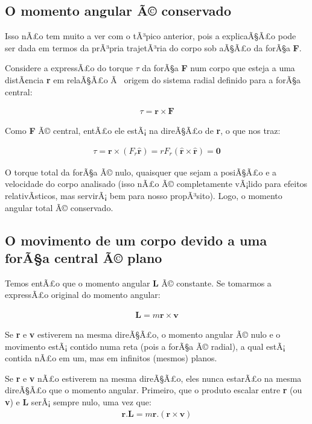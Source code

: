 \subsection{O momento angular Ã© conservado}

Isso nÃ£o tem muito a ver com o tÃ³pico anterior, pois a explicaÃ§Ã£o pode ser dada em termos da prÃ³pria trajetÃ³ria do corpo sob aÃ§Ã£o da forÃ§a \textbf{F}. {\\}

Considere a expressÃ£o do torque $\tau$ da forÃ§a \textbf{F} num corpo que esteja a uma distÃ¢ncia \textbf{r} em relaÃ§Ã£o Ã  origem do sistema radial definido para a forÃ§a central:

\begin{eqnarray}
	\tau = \mathbf{r} \times \mathbf{F} \label{eq19}
\end{eqnarray}

Como \textbf{F} Ã© central, entÃ£o ele estÃ¡ na direÃ§Ã£o de \textbf{r}, o que nos traz:

\begin{eqnarray}
	\tau = \mathbf{r} \times (F_r\mathbf{\hat{r}}) = rF_r(\mathbf{\hat{r}} \times \mathbf{\hat{r}}) = \mathbf{0} \label{eq20}
\end{eqnarray}

O torque total da forÃ§a Ã© nulo, quaisquer que sejam a posiÃ§Ã£o e a velocidade do corpo analisado (isso nÃ£o Ã© completamente vÃ¡lido para efeitos relativÃ­sticos, mas servirÃ¡ bem para nosso propÃ³sito). Logo, o momento angular total Ã© conservado.

\subsection{O movimento de um corpo devido a uma forÃ§a central Ã© plano}

Temos entÃ£o que o momento angular \textbf{L} Ã© constante. Se tomarmos a expressÃ£o original do momento angular:

\begin{eqnarray}
	\mathbf{L} = m\mathbf{r} \times \mathbf{v} \label{extra01}
\end{eqnarray}

Se \textbf{r} e \textbf{v} estiverem na mesma direÃ§Ã£o, o momento angular Ã© nulo e o movimento estÃ¡ contido numa reta (pois a forÃ§a Ã© radial), a qual estÃ¡ contida nÃ£o em um, mas em infinitos (mesmos) planos.{\\}

Se \textbf{r} e \textbf{v} nÃ£o estiverem na mesma direÃ§Ã£o, eles nunca estarÃ£o na mesma direÃ§Ã£o que o momento angular. Primeiro, que o produto escalar entre \textbf{r} (ou \textbf{v}) e \textbf{L} serÃ¡ sempre nulo, uma vez que:
\begin{eqnarray}
	\mathbf{r.L} = m\mathbf{r}.(\mathbf{r} \times \mathbf{v}) \label{extra02}
\end{eqnarray}

